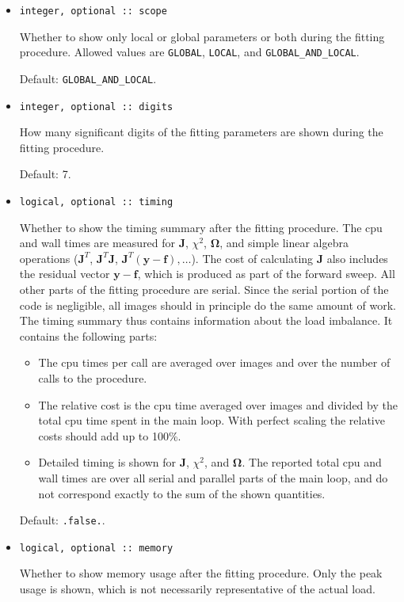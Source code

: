 \documentclass{article}
\begin{document}
\begin{itemize}
\item
\begin{verbatim}
integer, optional :: scope
\end{verbatim}
  Whether to show only local or global parameters or both during the fitting procedure. Allowed values are \verb+GLOBAL+, \verb+LOCAL+, and \verb+GLOBAL_AND_LOCAL+.

  Default: \verb+GLOBAL_AND_LOCAL+.
\item
\begin{verbatim}
integer, optional :: digits
\end{verbatim}
  How many significant digits of the fitting parameters are shown during the fitting procedure.

  Default: 7.
\item
\begin{verbatim}
logical, optional :: timing
\end{verbatim}
  Whether to show the timing summary after the fitting procedure. The cpu and wall times are measured for $\bm J$, $\chi^2$, $\bm\Omega$, and simple linear algebra operations ($\bm J^T$, $\bm J^T\bm J$, $\bm J^T(\bm y - \bm f), \ldots$). The cost of calculating $\bm J$ also includes the residual vector $\bm y - \bm f$, which is produced as part of the forward sweep. All other parts of the fitting procedure are serial. Since the serial portion of the code is negligible, all images should in principle do the same amount of work. The timing summary thus contains information about the load imbalance. It contains the following parts:
  \begin{itemize}
  \item The cpu times per call are averaged over images and over the number of calls to the procedure.
  \item The relative cost is the cpu time averaged over images and divided by the total cpu time spent in the main loop. With perfect scaling the relative costs should add up to 100\%.
  \item Detailed timing is shown for $\bm J$, $\chi^2$, and $\bm\Omega$. The reported total cpu and wall times are over all serial and parallel parts of the main loop, and do not correspond exactly to the sum of the shown quantities.
  \end{itemize}

  Default: \verb+.false.+.
\item
\begin{verbatim}
logical, optional :: memory
\end{verbatim}
  Whether to show memory usage after the fitting procedure. Only the peak usage is shown, which is not necessarily representative of the actual load.


\end{itemize}
\end{document}
